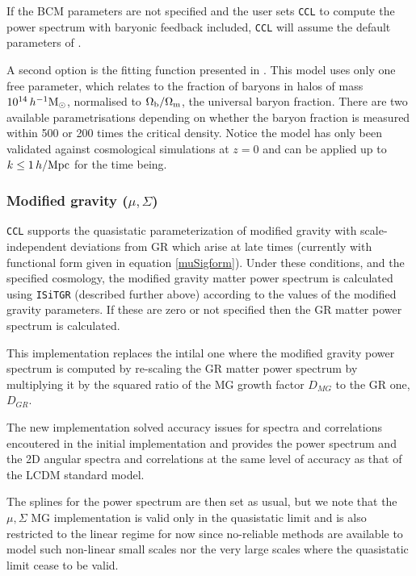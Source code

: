 \documentclass[\docopts]{\docclass}
\newcommand{\ccl}{{\tt CCL}\xspace}
\begin{document}
If the BCM parameters are not specified and the user sets \ccl to compute the power
spectrum with baryonic feedback included, \ccl will assume the default parameters
of \citet{Schneider15}.

A second option is the fitting function presented in \citet{vanDaalen19}. This model
uses only one free parameter, which relates to the fraction of baryons in halos of mass
$10^{14}\,h^{-1}\rm M_\odot$, normalised to $\Omega_{\rm b}/\Omega_{\rm m}$, the universal
baryon fraction. There are two available parametrisations depending on whether the
baryon fraction is measured within 500 or 200 times the critical density.
Notice the model has only been validated against cosmological simulations at $z=0$
and can be applied up to $k\leq 1\,h/\rm Mpc$ for the time being. 

\subsubsection{Modified gravity ($\mu, \Sigma$)}

\ccl supports the quasistatic parameterization of modified gravity with
scale-independent deviations from GR which arise at late times (currently with
functional form given in equation \ref{muSigform}). Under these conditions,
and the specified cosmology, the modified gravity matter power spectrum is
calculated using {\tt ISiTGR}  (described further above) according to the values of the modified
gravity parameters. If these are zero or not specified then the GR matter power
spectrum is calculated.

This implementation replaces the intilal one where the modified gravity power
spectrum is computed by re-scaling the GR matter power spectrum by
multiplying it by the squared ratio of the MG  growth factor $D_{MG}$ to the GR
one, $D_{GR}$.

The new implementation solved accuracy issues for spectra and  correlations
encoutered in the initial implementation and provides the power  spectrum and
the 2D angular spectra and correlations at the same level of accuracy
as that of the LCDM standard model.

The splines for the power spectrum are then set as usual, but we note that
the $\mu, \Sigma$ MG implementation is valid only in the quasistatic limit
and is also restricted to the linear regime for now since no-reliable methods
are available to model such non-linear small scales nor the very
large scales where the quasistatic limit cease to be valid.
\end{document}
